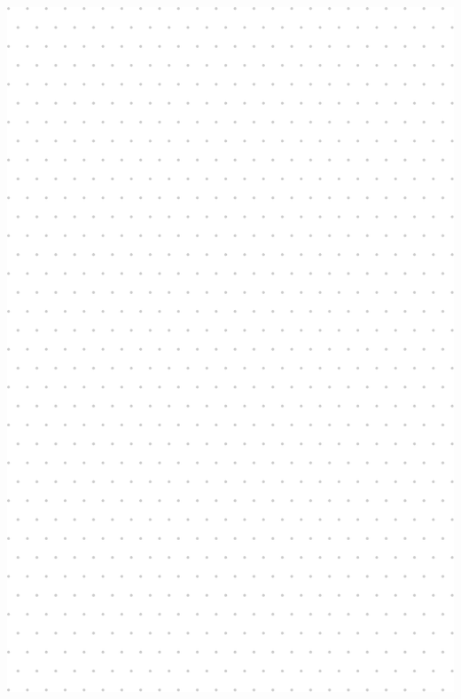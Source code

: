 \documentclass[
	openany, %
	parskip=full, %
	12pt, %
	a4paper, %
]{conferencebooklet} %
\begin{document}
\newpage
\includegraphics[width=\textwidth]{notes/notes-rest.pdf}






 

\newpage
\thispagestyle{empty} %

\newpage
~\vfill %
\end{document}
